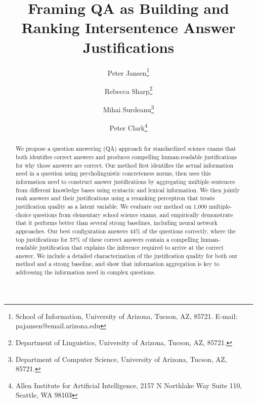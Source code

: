 \documentclass[fullname]{clv2}
\begin{document}
\title{Framing QA as Building and Ranking Intersentence Answer Justifications}

\author{Peter Jansen\thanks{School of Information, University of Arizona, Tucson, AZ, 85721. E-mail: pajansen@email.arizona.edu}}
%
\author{Rebecca Sharp\thanks{Department of Linguistics, University of Arizona, Tucson, AZ, 85721.}}
%
\author{Mihai Surdeanu\thanks{Department of Computer Science, University of Arizona, Tucson, AZ, 85721.}}
%
\author{Peter Clark\thanks{Allen Institute for Artificial Intelligence, 2157 N Northlake Way Suite 110, Seattle, WA 98103}}

\maketitle

\begin{abstract}
We propose a question answering (QA) approach for standardized science exams that both identifies correct answers and produces compelling human-readable justifications for why those answers are correct. 
Our method first identifies the actual information need in a question using psycholinguistic concreteness norms, then uses this information need to construct answer justifications by aggregating multiple sentences from different knowledge bases using syntactic and lexical information.  We then jointly rank answers and their justifications using a reranking perceptron that treats justification quality as a latent variable.  We evaluate our method on 1,000 multiple-choice questions from elementary school science exams, and empirically demonstrate that it performs better than several strong baselines, including neural network approaches. Our best configuration answers 44\% of the questions correctly, where the top justifications for 57\% of these correct answers contain a compelling human-readable justification that explains the inference required to arrive at the correct answer.  We include a detailed characterization of the justification quality for both our method and a strong baseline, and show that information aggregation is key to addressing the information need in complex questions. 
\end{abstract}














\newpage
\starttwocolumn


\end{document}
